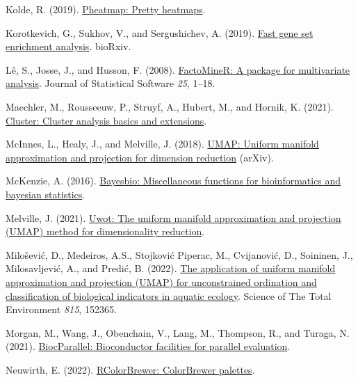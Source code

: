 \documentclass[
  parskip,
  oneside]{scrreprt}
\newlength{\cslhangindent}
\newlength{\cslentryspacingunit} %
\newenvironment{CSLReferences}[2] %
 {%
  \setlength{\parindent}{0pt}
  \ifodd #1
  \let\oldpar\par
  \def\par{\hangindent=\cslhangindent\oldpar}
  \fi
  \setlength{\parskip}{#2\cslentryspacingunit}
 }%
 {}
\begin{document}
\begin{CSLReferences}{0}{0}
\leavevmode{}%
Kolde, R. (2019).
\href{https://CRAN.R-project.org/package=pheatmap}{Pheatmap: Pretty
heatmaps}.

\leavevmode{}%
Korotkevich, G., Sukhov, V., and Sergushichev, A. (2019).
\href{https://doi.org/10.1101/060012}{Fast gene set enrichment
analysis}. bioRxiv.

\leavevmode{}%
Lê, S., Josse, J., and Husson, F. (2008).
\href{https://doi.org/10.18637/jss.v025.i01}{{FactoMineR}: A package for
multivariate analysis}. Journal of Statistical Software \emph{25},
1--18.

\leavevmode{}%
Maechler, M., Rousseeuw, P., Struyf, A., Hubert, M., and Hornik, K.
(2021). \href{https://CRAN.R-project.org/package=cluster}{Cluster:
Cluster analysis basics and extensions}.

\leavevmode{}%
McInnes, L., Healy, J., and Melville, J. (2018).
\href{https://doi.org/10.48550/ARXIV.1802.03426}{UMAP: Uniform manifold
approximation and projection for dimension reduction} (arXiv).

\leavevmode{}%
McKenzie, A. (2016).
\href{https://CRAN.R-project.org/package=bayesbio}{Bayesbio:
Miscellaneous functions for bioinformatics and bayesian statistics}.

\leavevmode{}%
Melville, J. (2021).
\href{https://CRAN.R-project.org/package=uwot}{Uwot: The uniform
manifold approximation and projection (UMAP) method for dimensionality
reduction}.

\leavevmode{}%
Milošević, D., Medeiros, A.S., Stojković Piperac, M., Cvijanović, D.,
Soininen, J., Milosavljević, A., and Predić, B. (2022).
\href{https://doi.org/10.1016/j.scitotenv.2021.152365}{The application
of uniform manifold approximation and projection (UMAP) for
unconstrained ordination and classification of biological indicators in
aquatic ecology}. Science of The Total Environment \emph{815}, 152365.

\leavevmode{}%
Morgan, M., Wang, J., Obenchain, V., Lang, M., Thompson, R., and Turaga,
N. (2021).
\href{https://github.com/Bioconductor/BiocParallel}{BiocParallel:
Bioconductor facilities for parallel evaluation}.

\leavevmode{}%
Neuwirth, E. (2022).
\href{https://CRAN.R-project.org/package=RColorBrewer}{RColorBrewer:
ColorBrewer palettes}.


\end{CSLReferences}
\end{document}
